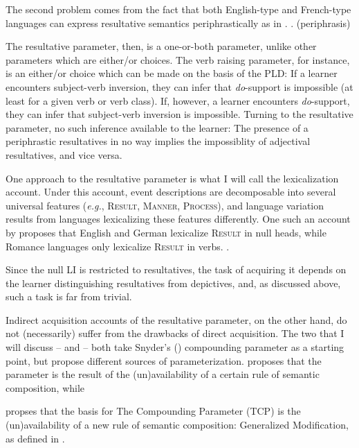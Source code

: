 \documentclass[MilwayThesis]{subfiles}
\begin{document}
The second problem comes from the fact that both English-type and French-type languages can express resultative semantics periphrastically as in \Next.
\ex. (periphrasis)

The resultative parameter, then, is a one-or-both parameter, unlike other parameters which are either/or choices.
The verb raising parameter, for instance, is an either/or choice which can be made on the basis of the PLD:
If a learner encounters subject-verb inversion, they can infer that \textit{do}-support is impossible (at least for a given verb or verb class). 
If, however, a learner encounters \textit{do}-support, they can infer that subject-verb inversion is impossible. 
Turning to the resultative parameter, no such inference available to the learner:
The presence of a periphrastic resultatives in no way implies the impossiblity of adjectival resultatives, and vice versa.

One approach to the resultative parameter is what I will call the lexicalization account.
Under this account, event descriptions are decomposable into several universal features (\textit{e.g.}, \textsc{Result}, \textsc{Manner}, \textsc{Process}), and language variation results from languages lexicalizing these features differently.
One such an account by \textcite{son2008microparameters} proposes that English and German lexicalize \textsc{Result} in null heads, while Romance languages only lexicalize \textsc{Result} in verbs.
\ex.

Since the null LI is restricted to resultatives, the task of acquiring it depends on the learner distinguishing resultatives from depictives, and, as discussed above, such a task is far from trivial.

Indirect acquisition accounts of the resultative parameter, on the other hand, do not (necessarily) suffer from the drawbacks of direct acquisition.
The two that I will discuss -- \textcite{snyder2012parameter} and \textcite{kratzer_building_2004} -- both take Snyder's (\citeyear{snyder1995language}) compounding parameter as a starting point, but propose different sources of parameterization.
\textcite{snyder2012parameter} proposes that the parameter is the result of the (un)availability of a certain rule of semantic composition, while \textcite{kratzer_building_2004}

\textcite{snyder2012parameter} propses that the basis for The Compounding Parameter (TCP) is the (un)availability of a new rule of semantic composition: Generalized Modification, as defined in \Next.
\end{document}
